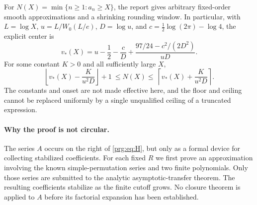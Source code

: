 \documentclass[11pt,letterpaper]{article}
\numberwithin{equation}{section}
\theoremstyle{definition}\newtheorem{definition}[theorem]{Definition}
\theoremstyle{remark}\newtheorem{remark}[theorem]{Remark}
\newcommand{\ceil}[1]{\left\lceil #1\right\rceil}
\newcommand{\floor}[1]{\left\lfloor #1\right\rfloor}
\begin{document}
For $N(X)=\min\{n\geq1:a_n\geq X\}$, the report gives arbitrary
fixed-order smooth approximations and a shrinking rounding window.
In particular, with $L=\log X$, $u=L/W_0(L/e)$, $D=\log u$, and
$c=\frac12\log(2\pi)-\log4$, the explicit center is
\begin{equation}\label{prg:eq:inverseintro}
 v_*(X)=u-\frac12-\frac{c}{D}
         +\frac{97/24-c^2/(2D^2)}{uD}.
\end{equation}
For some constant $K>0$ and all sufficiently large $X$,
\begin{equation}\label{prg:eq:inverseintrobracket}
 \floor{v_*(X)-\frac{K}{u^2D}}+1
 \ \leq N(X)\leq\
 \ceil{v_*(X)+\frac{K}{u^2D}}.
\end{equation}
The constants and onset are not made effective here, and the floor
and ceiling cannot be replaced uniformly by a single unqualified
ceiling of a truncated expression.

\paragraph{Why the proof is not circular.}
The series $A$ occurs on the right of \eqref{prg:eq:H}, but only as a
formal device for collecting stabilized coefficients. For each
fixed $R$ we first prove an approximation involving the known
simple-permutation series and two finite polynomials. Only those
series are submitted to the analytic asymptotic-transfer theorem.
The resulting coefficients stabilize as the finite cutoff grows.
No closure theorem is applied to $A$ before its factorial expansion
has been established.
\end{document}
